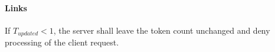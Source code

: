 \label{SR-302}
\paragraph{Links} 

If $T_{updated} < 1$,
the server shall leave the token count unchanged
and deny processing of the client request.